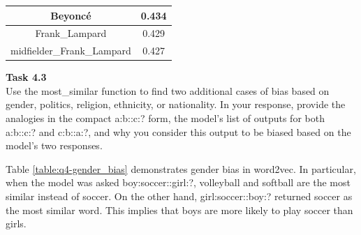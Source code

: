 \documentclass[12pt,article]{article}
\newenvironment{task}[2][Task]
    { \begin{mdframed}[backgroundcolor=gray!20] \textbf{#1 #2} \\}
    {  \end{mdframed}}
\begin{document}
\begin{table}[H]
\begin{minipage}[c]{0.25\linewidth}
{\begin{tabular}{|c|c|}
        \hline
        Beyoncé &  0.434 \\ 
        \hline
        Frank\_Lampard &  0.429 \\ 
        \hline
        midfielder\_Frank\_Lampard &  0.427 \\
        \hline
\end{tabular}}
\end{minipage}
\hspace{60pt}%
\begin{minipage}[c]{0.25\linewidth}%
\end{minipage}
\end{table}

\newpage
\begin{task}{4.3} 
Use the most\_similar function to find two additional cases of bias based on gender, politics, religion, ethnicity, or nationality. In your response, provide the analogies in the compact a:b::c:? form, the model's list of outputs for both a:b::c:? and c:b::a:?, and why you consider this output to be biased based on the model's two responses.
\end{task}

Table \ref{table:q4-gender_bias} demonstrates gender bias in word2vec. In particular, when the model was asked boy:soccer::girl:?, volleyball and softball are the most similar instead of soccer. On the other hand, girl:soccer::boy:? returned soccer as the most similar word. This implies that boys are more likely to play soccer than girls.
\end{document}
